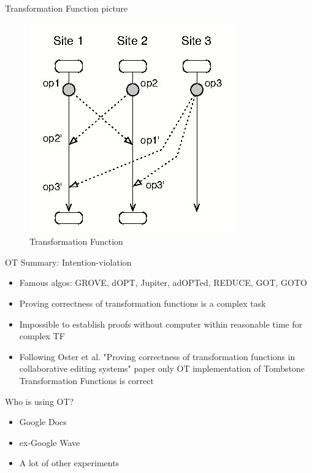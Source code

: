\documentclass{beamer}
\begin{document}
\begin{frame}{Transformation Function picture}

\begin{figure}
\includegraphics[scale=0.5]{OT-Transformation-Matrix.jpg}
\caption{Transformation Function}
\end{figure}

\end{frame}



\begin{frame}{OT Summary: Intention-violation}

\begin{itemize}
	\item Famous algos: GROVE, dOPT, Jupiter, adOPTed, REDUCE, GOT, GOTO
	\item Proving correctness of transformation functions is a complex task
	\item Impossible to establish proofs without computer within reasonable time for complex TF
	\item Following Oster et al. "Proving correctness of transformation functions in collaborative editing systems" paper only OT implementation of Tombstone Transformation Functions is correct
\end{itemize}
\end{frame}


\begin{frame}{Who is using OT?}

\begin{itemize}
	\item Google Docs
	\item ex-Google Wave
	\item A lot of other experiments
\end{itemize}
\end{frame}
\end{document}
